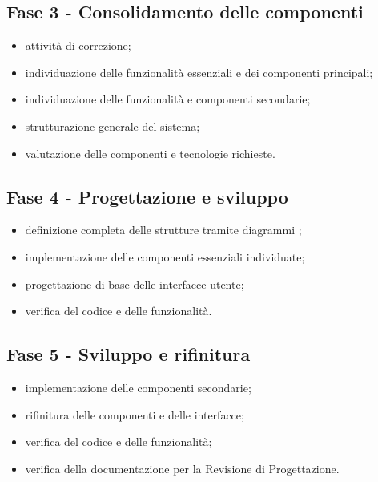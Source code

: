     \subsection{Fase 3 - Consolidamento delle componenti}
        \begin{itemize}
            \item attività di correzione;
            \item individuazione delle funzionalità essenziali e dei componenti principali;
            \item individuazione delle funzionalità e componenti secondarie;
            \item strutturazione generale del sistema;
            \item valutazione delle componenti e tecnologie richieste.
        \end{itemize}
    
    \subsection{Fase 4 - Progettazione e sviluppo}
        \begin{itemize}
            \item definizione completa delle strutture tramite diagrammi ;
            \item implementazione delle componenti essenziali individuate;
            \item progettazione di base delle interfacce utente;
            \item verifica del codice e delle funzionalità.
        \end{itemize}

    \subsection{Fase 5 - Sviluppo e rifinitura }
        \begin{itemize}
            \item implementazione delle componenti secondarie;
            \item rifinitura delle componenti e delle interfacce;
            \item verifica del codice e delle funzionalità;
            \item verifica della documentazione per la Revisione di Progettazione.
        \end{itemize}

